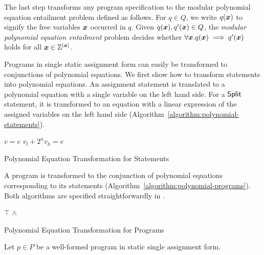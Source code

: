 
The last step transforms any program specification to the 
modular polynomial equation entailment problem defined as follows. For
$q \in Q$, we write $q(\vx)$ to signify the free variables $\vx$
occurred in $q$. Given $q(\vx), q'(\vx) \in Q$, the \emph{modular
  polynomial equation entailment} problem decides whether $\forall
\vx. q(\vx) \implies q'(\vx)$ holds for all $\vx \in \bbfZ^{|\vx|}$.

Programs in single static assignment form can easily be transformed to
conjunctions of polynomial equations. We first show how to transform
statements into polynomial equations. An assignment statement is
translated to a polynomial equation with a single variable on the left
hand side. For a $\mbox{\textsf{Split}}$ statement, it is transformed to an
equation with a linear expression of the assigned variables on the
left hand side (Algorithm~\ref{algorithm:polynomial-statements}). 
\begin{algorithm}
  \begin{algorithmic}[1]
        \Return $v = e$
      \EndCase
        \Return $v_l + 2^n v_h = e$
      \EndCase
    \EndMatch
    \EndFunction
  \end{algorithmic}
  \caption{Polynomial Equation Transformation for Statements}
  \label{algorithm:polynomial-statements}
\end{algorithm}

A program is transformed to the conjunction of polynomial
equations corresponding to its statements
(Algorithm~\ref{algorithm:polynomial-programs}). Both algorithms are
specified straightforwardly in \coq.

\begin{algorithm}
  \begin{algorithmic}[1]
      \Case{$\epsilon$} \Return $\top$ \EndCase
        \Return {} $\wedge$
      \EndCase
    \EndMatch
    \EndFunction
  \end{algorithmic}
  \caption{Polynomial Equation Transformation for Programs}
  \label{algorithm:polynomial-programs}
\end{algorithm}

\begin{theorem}
  Let $p \in P$ be a well-formed program in static single assignment
  form. 
\end{theorem}


